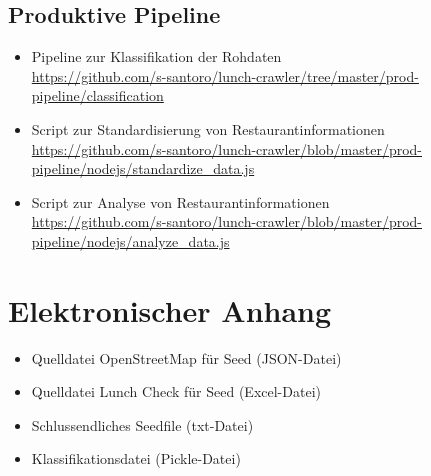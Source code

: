 \subsection{Produktive Pipeline}
\begin{itemize}
	\item Pipeline zur Klassifikation der Rohdaten\\ 
	\url{https://github.com/s-santoro/lunch-crawler/tree/master/prod-pipeline/classification}
	\item Script zur Standardisierung von Restaurantinformationen\\ 
	\url{https://github.com/s-santoro/lunch-crawler/blob/master/prod-pipeline/nodejs/standardize_data.js}
	\item Script zur Analyse von Restaurantinformationen\\ 
	\url{https://github.com/s-santoro/lunch-crawler/blob/master/prod-pipeline/nodejs/analyze_data.js}
\end{itemize} 
\section{Elektronischer Anhang}
\begin{itemize}
	\item Quelldatei OpenStreetMap für Seed (JSON-Datei)
	\item Quelldatei Lunch Check für Seed (Excel-Datei)
	\item Schlussendliches Seedfile (txt-Datei)
	\item Klassifikationsdatei (Pickle-Datei)
\end{itemize}